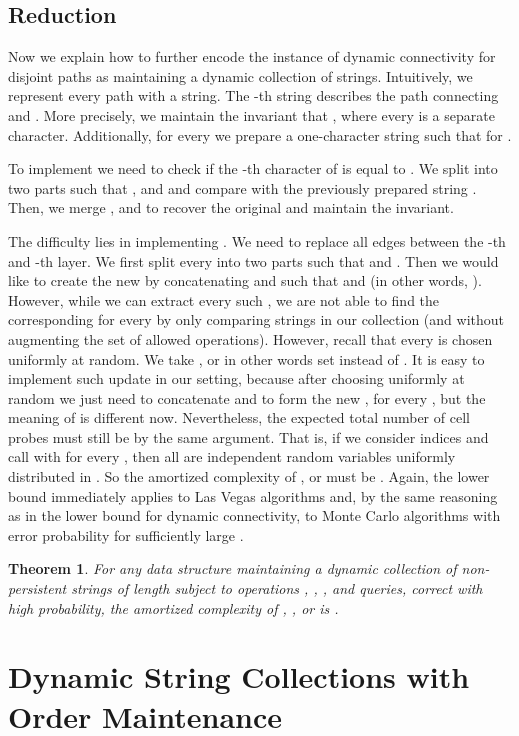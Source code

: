 \documentclass[a4paper]{article}
\newtheorem{theorem}{Theorem}[section]
\theoremstyle{remark}
\begin{document}
\subsection{Reduction}
Now we explain how to further encode the instance of dynamic connectivity for disjoint paths
as maintaining a dynamic collection of strings. Intuitively, we represent every path with
a string.
The -th string  describes the path connecting  and .
More precisely, we maintain the invariant that ,
where every  is a separate character. Additionally, for every  we prepare
a one-character string  such that  for .

To implement  we need to check if the -th character of 
is equal to . We split  into two parts  such that , 
and 
and compare  with the previously prepared string . Then,
we merge ,  and  to recover the original  and maintain the invariant.

The difficulty lies in implementing . We need to replace all edges between
the -th and -th layer. We first split every  into two parts  such that
 and . Then we would like to create the new 
by concatenating  and  such that  and 
(in other words, ). However, while we can extract every such ,
we are not able to find the corresponding  for every  by only comparing
strings in our collection (and without augmenting the set of allowed operations).
However, recall that every  is chosen uniformly at random. We take ,
or in other words set  instead of .
It is easy to implement such update in our setting, because after choosing 
uniformly at random we just need to concatenate  and  to form
the new , for every , but the meaning of 
is different now. Nevertheless, the expected total
number of cell probes must still be  by the same argument. That is,
if we consider  indices 
and call  with  for
every , then all  are independent random variables uniformly
distributed in . So the amortized complexity of ,  or
 must be . Again, the lower bound immediately
applies to Las Vegas algorithms and, by the same reasoning as in the lower bound for
dynamic connectivity, to Monte Carlo algorithms with error probability 
for sufficiently large .


\begin{theorem}
\label{thm:polylowerbound}
For any data structure maintaining a dynamic collection of  non-persistent strings of length
 subject to operations , , , and
 queries, correct with high probability, the amortized complexity of
, , or  is .
\end{theorem}

\section{Dynamic String Collections with Order Maintenance}\label{sec:om}
\end{document}
